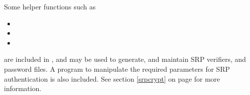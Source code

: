 Some helper functions such as
\begin{itemize}
\item {}
\item {}
\item {}
\end{itemize}
are included in \gnutls{}, and may be used to generate, and maintain
SRP verifiers, and password files. A program to manipulate the required parameters 
for SRP authentication is also included. See section \ref{srpcrypt} on 
page \pageref{srpcrypt} for more information.

